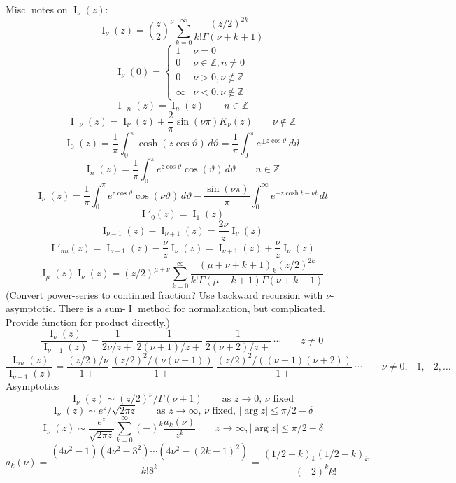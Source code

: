 \documentclass[10pt,dvipdfmx,letterpaper,twoside]{article}
\let\O=\operatorname
\newcommand{\ZZ}{{\mathbb{Z}}}
\let\Gam=\Gamma
\let\theta=\vartheta
\begin{document}
Misc. notes on $\O{I}_\nu(z)$:
\[ \O{I}_\nu(z) = \left(\frac{z}{2}\right)^\nu \sum_{k=0}^\infty \frac{(z/2)^{2k}}{k! \Gam(\nu+k+1)} \]
\[ \O{I}_\nu(0) = \begin{cases} 1 & \nu=0\\ 0 & \nu\in\ZZ, n\neq0\\ 0 & \nu>0,\nu\notin\ZZ\\ \infty & \nu<0,\nu\notin\ZZ\end{cases} \]
\[ \O{I}_{-n}(z) = \O{I}_{n}(z) \qquad n\in\ZZ \]
\[ \O{I}_{-\nu}(z) = \O{I}_{\nu}(z) + \frac{2}{\pi} \sin(\nu\pi) K_{\nu}(z) \qquad \nu\notin\ZZ \]
\[ \O{I}_0(z) = \frac1\pi \int_0^\pi \cosh(z \cos\theta)\,d\theta = \frac1\pi \int_0^\pi e^{\pm z \cos\theta}\,d\theta \]
\[ \O{I}_n(z) = \frac1\pi \int_0^\pi e^{z\cos\theta} \cos(\theta)\,d\theta \qquad n\in\ZZ \]
\[ \O{I}_\nu(z) = \frac1\pi \int_0^\pi e^{z\cos\theta} \cos(\nu\theta)\,d\theta - \frac{\sin(\nu\pi)}{\pi} \int_0^\infty e^{-z\cosh t - \nu t}\,dt \]
\[ \O{I}'_0(z) = \O{I}_1(z) \]
\[ \O{I}_{\nu-1}(z) - \O{I}_{\nu+1}(z) = \frac{2\nu}{z} \O{I}_{\nu}(z) \]
\[ \O{I}'_{nu}(z) = \O{I}_{\nu-1}(z) - \frac{\nu}{z}\O{I}_{\nu}(z) = \O{I}_{\nu+1}(z) + \frac{\nu}{z} \O{I}_{\nu}(z) \]
\[ \O{I}_{\mu}(z) \O{I}_{\nu}(z) = (z/2)^{\mu+\nu} \sum_{k=0}^\infty \frac{(\mu+\nu+k+1)_k (z/2)^{2k}}{k! \Gam(\mu+k+1) \Gam(\nu+k+1)} \]
(Convert power-series to continued fraction?  Use backward recursion with $\nu$-asymptotic.  There is a sum-$\O{I}$ method for normalization, but complicated.
Provide function for product directly.)
\[ \frac{\O{I}_{\nu}(z)}{\O{I}_{\nu-1}(z)} = \frac{1}{2\nu/z+{}}\ \frac{1}{2(\nu+1)/z+{}}\ \frac{1}{2(\nu+2)/z+{}}\ \cdots \qquad z\neq0\]
\[ \frac{\O{I}_{nu}(z)}{\O{I}_{\nu-1}(z)} = \frac{(z/2)/\nu}{1+{}}\ \frac{(z/2)^2/(\nu(\nu+1))}{1+{}}\ \frac{(z/2)^2/((\nu+1)(\nu+2))}{1+{}}\ \cdots
  \qquad\nu\neq0,-1,-2,\dots \]
Asymptotics
\[ \O{I}_\nu(z) \sim (z/2)^\nu/\Gam(\nu+1) \qquad\text{as $z\to0$, $\nu$ fixed} \]
\[ \O{I}_\nu(z) \sim e^z/\sqrt{2\pi z} \qquad\text{as $z\to\infty$, $\nu$ fixed, $|\arg z|\leq\pi/2-\delta$} \]
\[ \O{I}_\nu(z) \sim \frac{e^z}{\sqrt{2\pi z}} \sum_{k=0}^\infty(-)^k \frac{a_k(\nu)}{z^k} \qquad z\to\infty, |\arg z|\leq\pi/2-\delta \]
\[ a_k(\nu) = \frac{(4\nu^2-1)(4\nu^2-3^2)\cdots(4\nu^2-(2k-1)^2)}{k! 8^k} = \frac{(1/2-k)_k(1/2+k)_k}{(-2)^k k!} \]
\end{document}
